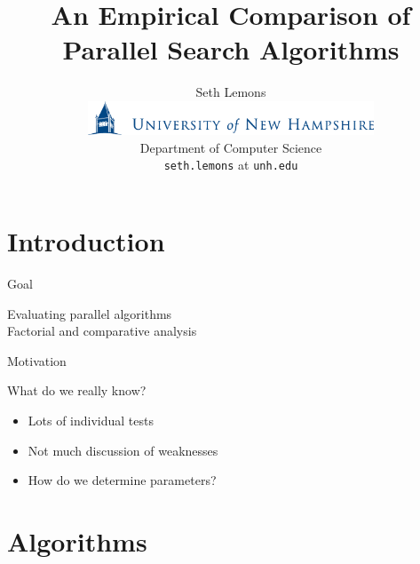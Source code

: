 \documentclass[style=unh]{powerdot}
\title{An Empirical Comparison of Parallel Search Algorithms}
\author{Seth Lemons \vspace{0.2in} \\
  \includegraphics[height=0.4in]{figures/unh-logo-words.eps} \\
  Department of Computer Science \\
  {\tt seth.lemons} at {\tt unh.edu}}
\date{\mbox{}}
\begin{document}
\maketitle


\section[slide=false]{Introduction}


\begin{slide}{Goal}
  \vspace{1in}
  \begin{center}
    Evaluating parallel algorithms \\
    {\tiny Factorial and comparative analysis}
  \end{center}

\end{slide}


\begin{slide}{Motivation}
    \begin{center}
      What do we really know?
    \end{center}

    \begin{itemize}
    \item Lots of individual tests
    \item Not much discussion of weaknesses
    \item How do we determine parameters?
    \end{itemize}
\end{slide}


\section{Algorithms}

\end{document}
